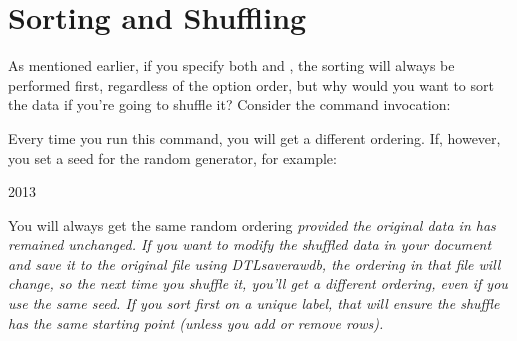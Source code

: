 \section{Sorting and Shuffling}\label{sec:sortshuffle}

As mentioned earlier, if you specify both  and
, the sorting will always be performed first, 
regardless of the option order, but why would you want to sort the data
if you're going to shuffle it? Consider the command invocation:
\begin{terminal}
     
\end{terminal}
Every time you run this command, you will get a different ordering.
If, however, you set a seed for the random generator, for example:
\begin{terminal}
  2013     
\end{terminal}
You will always get the same random ordering \em{provided the original 
data in  has remained unchanged}. If you want to 
modify the shuffled data in your document and save it to the original 
file  using \gls{DTLsaverawdb}, the ordering in 
that file will change, so the next time you shuffle it, you'll get 
a different ordering, even if you use the same seed. If you sort
first on a unique label, that will ensure the shuffle has the same 
starting point (unless you add or remove rows).

